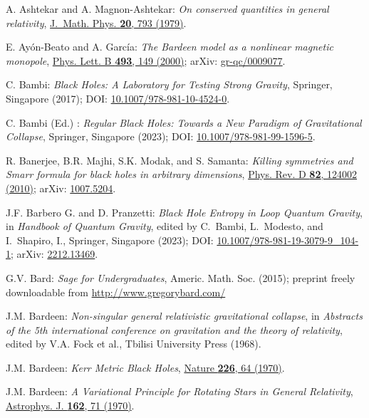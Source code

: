 \begin{thebibliography}{123}
A. Ashtekar and A. Magnon-Ashtekar:
{\em On conserved quantities in general relativity},
\href{https://doi.org/10.1063/1.524151}{J.~Math. Phys. {\bf 20}, 793 (1979)}.

E. Ayón-Beato and A. García:
{\em The Bardeen model as a nonlinear magnetic monopole},
\href{https://doi.org/10.1016/S0370-2693(00)01125-4}{Phys. Lett. B {\bf 493}, 149 (2000)};
arXiv: \href{https://arxiv.org/abs/gr-qc/0009077}{gr-qc/0009077}.

C. Bambi: {\em Black Holes: A Laboratory for Testing Strong Gravity},
Springer, Singapore (2017);
DOI: \href{https://doi.org/10.1007/978-981-10-4524-0}{10.1007/978-981-10-4524-0}.

C. Bambi (Ed.) : {\em Regular Black Holes: Towards a New Paradigm of Gravitational Collapse},
Springer, Singapore (2023);
DOI: \href{https://doi.org/10.1007/978-981-99-1596-5}{10.1007/978-981-99-1596-5}.

R. Banerjee, B.R. Majhi, S.K. Modak, and S. Samanta:
{\em Killing symmetries and Smarr formula for black holes in arbitrary dimensions},
\href{https://doi.org/10.1103/PhysRevD.82.124002}{Phys. Rev. D {\bf 82}, 124002 (2010)};
arXiv: \href{https://arxiv.org/abs/1007.5204}{1007.5204}.

J.F. Barbero G. and D. Pranzetti:
{\em Black Hole Entropy in Loop Quantum Gravity},
in {\em Handbook of Quantum Gravity}, edited by C.~Bambi, L.~Modesto, and I.~Shapiro, I.,
Springer, Singapore (2023);
DOI: \href{https://doi.org/10.1007/978-981-19-3079-9_104-1}{10.1007/978-981-19-3079-9\_104-1};
arXiv: \href{https://arxiv.org/abs/2212.13469}{2212.13469}.

G.V. Bard: {\em Sage for Undergraduates}, Americ. Math. Soc. (2015);
preprint freely downloadable from \url{http://www.gregorybard.com/}

J.M. Bardeen:
{\em Non-singular general relativistic gravitational collapse},
in \emph{Abstracts of the 5th international conference on gravitation and the theory of relativity}, edited by V.A. Fock et al., Tbilisi University Press (1968).

J.M. Bardeen:
{\em Kerr Metric Black Holes},
\href{https://doi.org/10.1038/226064a0}{Nature {\bf 226}, 64 (1970)}.

J.M. Bardeen:
{\em A Variational Principle for Rotating Stars in General Relativity},
\href{https://doi.org/10.1086/150635}{Astrophys. J. {\bf  162}, 71 (1970)}.


\end{thebibliography}
